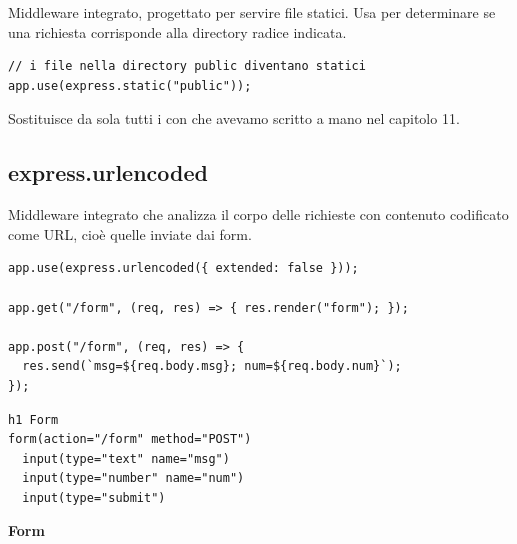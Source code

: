 Middleware integrato, progettato per servire file statici. Usa 
per determinare se una richiesta corrisponde alla directory radice indicata.

\begin{affianco}[0.55][c]
\begin{lstlisting}[style=js]
// i file nella directory public diventano statici
app.use(express.static("public"));
\end{lstlisting}
\risultato
\begin{immagine}
\end{immagine}
\end{affianco}

Sostituisce da sola tutti i  con  che avevamo
scritto a mano nel capitolo 11.

\subsection{express.urlencoded}

Middleware integrato che analizza il corpo delle richieste con contenuto
codificato come URL, cioè quelle inviate dai form.

\begin{affianco}[0.55]
\begin{lstlisting}[style=js, name=form.js]
app.use(express.urlencoded({ extended: false }));

app.get("/form", (req, res) => { res.render("form"); });

app.post("/form", (req, res) => {
  res.send(`msg=${req.body.msg}; num=${req.body.num}`);
});
\end{lstlisting}
\risultato
\begin{lstlisting}[style=pug, name=views/form.pug]
h1 Form
form(action="/form" method="POST")
  input(type="text" name="msg")
  input(type="number" name="num")
  input(type="submit")
\end{lstlisting}
\begin{browser}
  {\Lora\bfseries\LARGE Form}\\[4pt]
  \ \ 
\end{browser}
\end{affianco}

